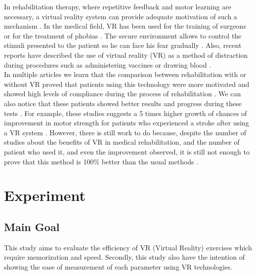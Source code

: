 \documentclass[12pt, openany, twocolumn]{article}
\begin{document}
In rehabilitation therapy, where repetitive feedback and motor learning are necessary, a virtual reality system can provide adequate motivation of such a mechanism \cite{kimEffectsVRbasedWii2014}.
In the medical field, VR has been used for the training of surgeons \cite{laverVirtualRealityStroke2017} or for the treatment of phobias \cite{morelAdvantagesLimitationsVirtual2015}. The secure environment allows to control the stimuli presented to the patient so he can face his fear gradually \cite{morelAdvantagesLimitationsVirtual2015}.
Also, recent reports have described the use of virtual reality (VR) as a method of distraction during procedures such as administering vaccines or drawing blood \cite{araneVirtualRealityPain2017}.
\\

In multiple articles we learn that the comparison between rehabilitation with or without VR proved that patients using this technology were more motivated and showed high levels of compliance during the process of rehabilitation \cite{sampaioDoesVirtualRealitybased2016, chenProgressSensorimotorRehabilitative2014}.
We can also notice that these patients showed better results and progress during these tests \cite{corbettaRehabilitationThatIncorporates2015, saposnikEffectivenessVirtualReality2010, chenProgressSensorimotorRehabilitative2014, saposnikgustavoVirtualRealityStroke2011}.
For example, these studies suggests a 5 times higher growth of chances of improvement in motor strength for patients who experienced a stroke after using a VR system \cite{saposnikgustavoVirtualRealityStroke2011}.
However, there is still work to do because, despite the number of studies about the benefits of VR in medical rehabilitation, and the number of patient who used it, and even the improvement observed, it is still not enough to prove that this method is 100\% better than the usual methods \cite{saposnikEffectivenessVirtualReality2010, saposnikgustavoVirtualRealityStroke2011, luque-morenoDecadeProgressUsing2015}.

\section{Experiment}
    \subsection{Main Goal}
    This study aims to evaluate the efficiency of VR (Virtual Reality) exercises which require memorization and speed.
    Secondly, this study also have the intention of showing the ease of measurement of each parameter using VR technologies.
    \\
\end{document}
